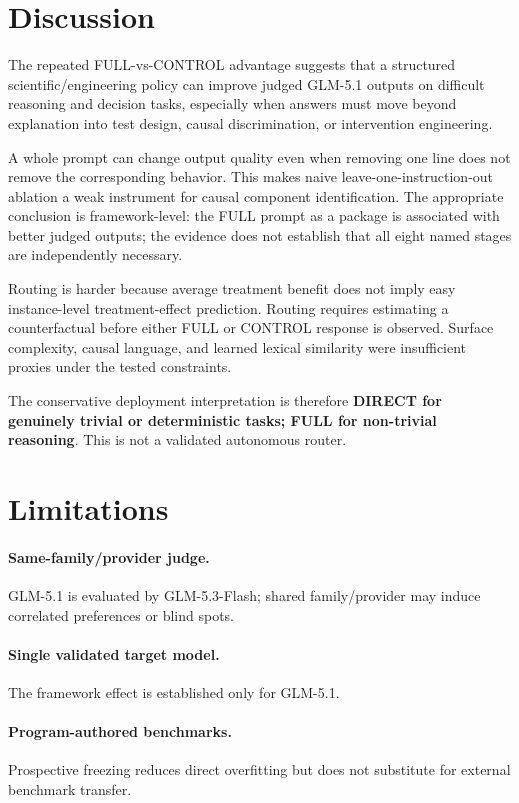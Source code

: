 \documentclass[11pt]{article}
\begin{document}
\section{Discussion}
The repeated FULL-vs-CONTROL advantage suggests that a structured scientific/engineering policy can improve judged GLM-5.1 outputs on difficult reasoning and decision tasks, especially when answers must move beyond explanation into test design, causal discrimination, or intervention engineering.

A whole prompt can change output quality even when removing one line does not remove the corresponding behavior. This makes naive leave-one-instruction-out ablation a weak instrument for causal component identification. The appropriate conclusion is framework-level: the FULL prompt as a package is associated with better judged outputs; the evidence does not establish that all eight named stages are independently necessary.

Routing is harder because average treatment benefit does not imply easy instance-level treatment-effect prediction. Routing requires estimating a counterfactual before either FULL or CONTROL response is observed. Surface complexity, causal language, and learned lexical similarity were insufficient proxies under the tested constraints.

The conservative deployment interpretation is therefore \textbf{DIRECT for genuinely trivial or deterministic tasks; FULL for non-trivial reasoning}. This is not a validated autonomous router.

\section{Limitations}
\paragraph{Same-family/provider judge.} GLM-5.1 is evaluated by GLM-5.3-Flash; shared family/provider may induce correlated preferences or blind spots.

\paragraph{Single validated target model.} The framework effect is established only for GLM-5.1.

\paragraph{Program-authored benchmarks.} Prospective freezing reduces direct overfitting but does not substitute for external benchmark transfer.
\end{document}
